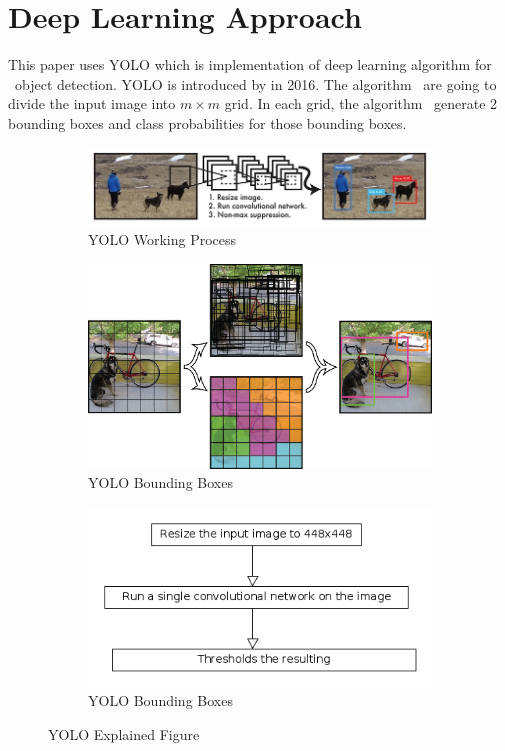 \documentclass[conference]{IEEEtran}
\begin{document}
\section{Deep Learning Approach}
This paper uses YOLO which is implementation of deep learning algorithm for \
object detection. YOLO is introduced by \cite{Redmon} in 2016. The algorithm \
are going to divide the input image into $m \times m$ grid. In each grid, the algorithm \
generate 2 bounding boxes and class probabilities for those bounding boxes.

\begin{figure}[h]
\centering
	\begin{subfigure}[h]{0.3\textwidth} 
		\centering
		\includegraphics[scale=0.2]{figures/yolo_figure_01.jpeg}
		\caption{YOLO Working Process\cite{Redmon}}
	\end{subfigure}
	\begin{subfigure}[h]{0.3\textwidth} 
		\centering
		\includegraphics[scale=0.2]{figures/yolo_figure_02.png}
		\caption{YOLO Bounding Boxes\cite{Redmon}}
	\end{subfigure}
	\begin{subfigure}[h]{0.3\textwidth} 
		\centering
		\includegraphics[scale=0.2]{figures/yolo_working_process.png}
		\caption{YOLO Bounding Boxes\cite{Redmon}}
	\end{subfigure}
	\caption{YOLO Explained Figure}
\end{figure}
\end{document}
